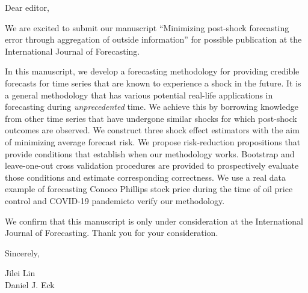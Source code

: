 \documentclass[11pt]{article}
\begin{document}
\footnotesize

\normalsize 


Dear editor,

We are excited to submit our manuscript ``Minimizing post-shock forecasting error through aggregation of outside information'' for possible publication at the  International Journal of Forecasting. 

In this manuscript, we  develop a forecasting methodology for providing credible forecasts for time series that are known to  experience a shock in the future. It is a general methodology that has various potential real-life applications in forecasting during  \emph{unprecedented} time. We achieve this by borrowing knowledge from other time series that have undergone similar shocks for which post-shock outcomes are observed. We construct three shock effect estimators  with the aim of minimizing average forecast risk. We propose risk-reduction propositions that provide conditions that establish when our methodology works. Bootstrap and leave-one-out cross validation procedures are provided to prospectively evaluate those conditions and estimate corresponding correctness. We use a real data example of forecasting Conoco Phillips stock price during the time  of   oil price control and COVID-19 pandemicto verify  our methodology.

We confirm that this manuscript is only under consideration at the International Journal of Forecasting. Thank you for your consideration.

Sincerely,

Jilei Lin \\
Daniel J. Eck 
\end{document}
